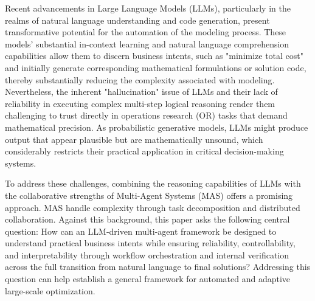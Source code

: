 \documentclass[preprint,12pt]{elsarticle}
\begin{document}
Recent advancements in Large Language Models (LLMs), particularly in the realms of natural language understanding and code generation, present transformative potential for the automation of the modeling process. These models' substantial in-context learning and natural language comprehension capabilities allow them to discern business intents, such as "minimize total cost" and initially generate corresponding mathematical formulations or solution code, thereby substantially reducing the complexity associated with modeling. Nevertheless, the inherent "hallucination" issue of LLMs and their lack of reliability in executing complex multi-step logical reasoning render them challenging to trust directly in operations research (OR) tasks that demand mathematical precision. As probabilistic generative models, LLMs might produce output that appear plausible but are mathematically unsound, which considerably restricts their practical application in critical decision-making systems. 

To address these challenges, combining the reasoning capabilities of LLMs with the collaborative strengths of Multi-Agent Systems (MAS) offers a promising approach. MAS handle complexity through task decomposition and distributed collaboration. Against this background, this paper asks the following central question: How can an LLM-driven multi-agent framework be designed to understand practical business intents while ensuring reliability, controllability, and interpretability through workflow orchestration and internal verification across the full transition from natural language to final solutions? Addressing this question can help establish a general framework for automated and adaptive large-scale optimization. 
\end{document}
